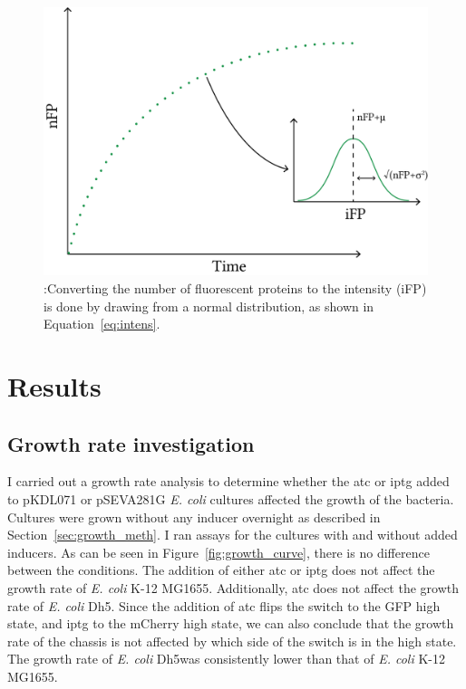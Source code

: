 \begin{figure}[htbp]
	\begin{center}
		\includegraphics[scale=0.6]{../../chapters/chapterABCFlow/images/intensity_calc.png}
		\caption[LoF caption]{\label{fig:intensity_calc}:Converting the number of fluorescent proteins to the intensity (iFP) is done by drawing from a normal distribution, as shown in Equation~\ref{eq:intens}.}
	\end{center}
\end{figure}

\section{Results}
\subsection{Growth rate investigation}

I carried out a growth rate analysis to determine whether the \acrshort{atc} or \acrshort{iptg} added to pKDL071 or pSEVA281G \textit{E. coli} cultures affected the growth of the bacteria. Cultures were grown without any inducer overnight as described in Section~\ref{sec:growth_meth}. I ran assays for the cultures with and without added inducers. As can be seen in Figure~\ref{fig:growth_curve}, there is no difference between the conditions. The addition of either \acrshort{atc} or \acrshort{iptg} does not affect the growth rate of \textit{E. coli} K-12 MG1655. Additionally, \acrshort{atc} does not affect the growth rate of \textit{E. coli} Dh5\textalpha. Since the addition of \acrshort{atc} flips the switch to the GFP high state, and \acrshort{iptg} to the mCherry high state, we can also conclude that the growth rate of the chassis is not affected by which side of the switch is in the high state. The growth rate of \textit{E. coli} Dh5\textalpha was consistently lower than that of \textit{E. coli} K-12 MG1655.


